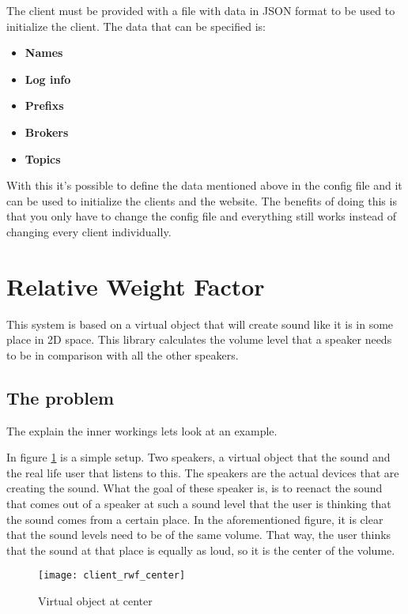 The client must be provided with a file with data in JSON format to be used to initialize the client. The data that can be specified is:
\small{
\begin{itemize} [noitemsep, nolistsep]
	\item \textbf {Names}
	\item \textbf {Log info}
	\item \textbf {Prefixs}
	\item \textbf {Brokers}
	\item \textbf {Topics\\}
\end{itemize}
}
With this it's possible to define the data mentioned above in the config file and it can be used to initialize the clients and the website. The benefits of doing this is that you only have to change the config file and everything still works instead of changing every client individually.

\section{Relative Weight Factor}
\label{sec:client_relative_weight_factor}

This system is based on a virtual object that will create sound like it is in some place in 2D space.
This library calculates the volume level that a speaker needs to be in comparison with all the other speakers.

\subsection{The problem}
\label{sub:client_rwf_the_problem}

The explain the inner workings lets look at an example.

In figure \ref{fig:client_rwf_center} is a simple setup. Two speakers, a virtual object that  the sound and the real life user that listens to this.
The speakers are the actual devices that are creating the sound.
What the goal of these speaker is, is to reenact the sound that comes out of a speaker at such a sound level that the user is thinking that the sound comes from a certain place.
In the aforementioned figure, it is clear that the sound levels need to be of the same volume.
That way, the user thinks that the sound at that place is equally as loud, so it is the center of the volume.
\begin{figure}[H]
    \centering
    \texttt{[image: client\_rwf\_center]}
    \caption{Virtual object at center}
    \label{fig:client_rwf_center}
\end{figure}

